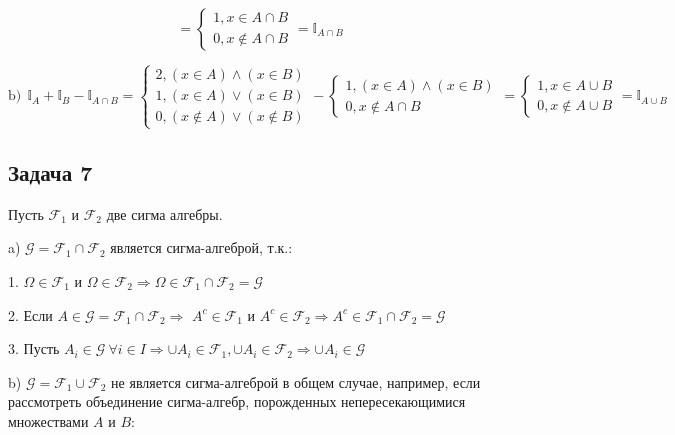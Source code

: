 \documentclass[a4paper,12pt]{article} %
\begin{document}
\begin{equation}\label{key}
= \begin{cases} 1,  x \in A \cap B \\0,  x \notin A \cap B 
\end{cases}  = \mathbb{I}_{A \cap B}
\end{equation}



\begin{equation}\label{key}
\text{b)}  \ \   \mathbb{I}_{A}  +  \mathbb{I}_{B} -  \mathbb{I}_{A \cap B}   =  \begin{cases} 2,  (x \in A) \wedge (x \in B)  \\  1,  (x \in A) \vee (x \in B)  \\0,  (x \notin A) \vee (x \notin B)    
\end{cases}  -  \begin{cases} 1,  (x \in A) \wedge (x \in B) \\0,  x \notin A \cap B   
\end{cases}  = \begin{cases} 1,  x \in A \cup B \\0,  x \notin A \cup B 
\end{cases}  = \mathbb{I}_{A \cup B} 
\end{equation}

\subsection*{Задача 7}

Пусть $\mathcal{F}_1$  и $\mathcal{F}_2$ две сигма алгебры. 


a) $ \mathcal{G} = \mathcal{F}_1 \cap \mathcal{F}_2 $ является сигма-алгеброй, т.к.:

1. $\Omega \in \mathcal{F}_1$ и $\Omega \in \mathcal{F}_2 \Rightarrow  \Omega \in \mathcal{F}_1 \cap \mathcal{F}_2  = \mathcal{G}  $  

2. Если $A \in  \mathcal{G}  = \mathcal{F}_1 \cap \mathcal{F}_2  \Rightarrow   $
$A^c \in \mathcal{F}_1$ и $A^c \in \mathcal{F}_2 \Rightarrow  A^c \in \mathcal{F}_1 \cap \mathcal{F}_2  = \mathcal{G}  $  

3. Пусть $A_i \in \mathcal{G} \  \forall i \in I  \Rightarrow   \cup A_i \in  \mathcal{F}_1, \cup A_i \in  \mathcal{F}_2  \Rightarrow \cup A_i \in \mathcal{G}$ 

b)  $ \mathcal{G} = \mathcal{F}_1 \cup \mathcal{F}_2 $ не является сигма-алгеброй в общем случае, например, если  рассмотреть объединение сигма-алгебр, порожденных непересекающимися множествами $A$ и $ B$:
\end{document}
